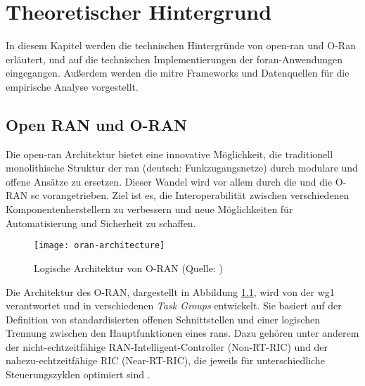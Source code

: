 \chapter{Theoretischer Hintergrund}
\label{chap:technischerHintergrund}
In diesem Kapitel werden die technischen Hintergründe von \gls{open-ran} und O-Ran erläutert, und auf die technischen Implementierungen der \gls{foran}-Anwendungen eingegangen. Außerdem werden die \gls{mitre} Frameworks und Datenquellen für die empirische Analyse vorgestellt.

\section{Open RAN und O-RAN}
\label{sec:tech-openran}
Die \gls{open-ran} Architektur bietet eine innovative Möglichkeit, die traditionell monolithische Struktur der \gls{ran} (deutsch: Funkzugangsnetze) durch modulare und offene Ansätze zu ersetzen. Dieser Wandel wird vor allem durch die \orana{} und die O-RAN \gls{sc} vorangetrieben. Ziel ist es, die Interoperabilität zwischen verschiedenen Komponentenherstellern zu verbessern und neue Möglichkeiten für Automatisierung und Sicherheit zu schaffen.

\begin{figure}
    \centering
    \texttt{[image: oran-architecture]}
    \caption{Logische Architektur von O-RAN (Quelle: \autocite{ORANAlliance})}
    \label{fig:oran-architecture}
\end{figure}

Die Architektur des O-RAN, dargestellt in Abbildung \ref{fig:oran-architecture}, wird von der \gls{wg1} verantwortet und in verschiedenen \textit{Task Groups} entwickelt. Sie basiert auf der Definition von standardisierten offenen Schnittstellen und einer logischen Trennung zwischen den Hauptfunktionen eines \glspl{ran}. Dazu gehören unter anderem der nicht-echtzeitfähige RAN-Intelligent-Controller (Non-RT-RIC) und der nahezu-echtzeitfähige RIC (Near-RT-RIC), die jeweils für unterschiedliche Steuerungszyklen optimiert sind \autocite{o-ranworkgroup1usecasesandoverallarchitectureORANArchitectureDescription2024}.

